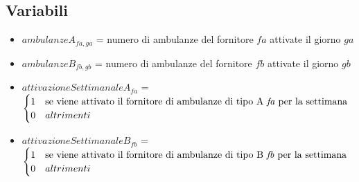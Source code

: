 \subsection{Variabili}
\begin{itemize}
    \item $ambulanzeA_{fa, ga}$ = numero di ambulanze del fornitore $fa$ attivate il giorno $ga$
    \item $ambulanzeB_{fb, gb}$ =  numero di ambulanze del fornitore $fb$ attivate il giorno $gb$
    \item $attivazioneSettimanaleA_{fa}$ = 
    \(
    \begin{cases}
        1 & \text{se viene attivato il fornitore di ambulanze di tipo A \textit{fa} per la settimana} \\
        0 & altrimenti
    \end{cases}\)
    \item $attivazioneSettimanaleB_{fb}$ = 
    \(
    \begin{cases}
        1 & \text{se viene attivato il fornitore di ambulanze di tipo B \textit{fb} per la settimana} \\
        0 & altrimenti
    \end{cases}\)
\end{itemize}
